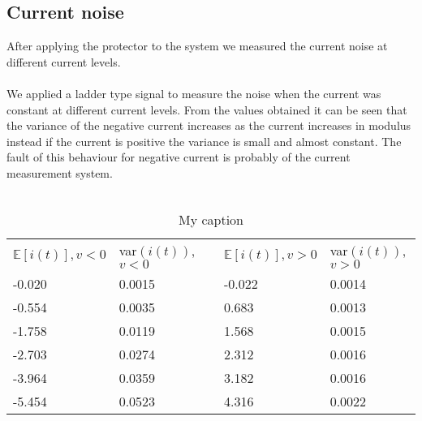 \subsection{Current noise}
After applying the protector to the system we measured the current noise at different current levels.\\ \\
We applied a ladder type signal to measure the noise when the current was constant at different current levels. From the values obtained it can be seen that the variance of the negative current increases as the current increases in modulus instead if the current is positive the variance is small and almost constant. The fault of this behaviour for negative current is probably of the current measurement system.\\ \\
\begin{table}[]
\centering
\caption{My caption}
\label{my-label}
\begin{tabular}{lllll}
\cline{1-2} \cline{4-5}
\multicolumn{1}{|l|}{$\mathbb{E}[i(t)], v < 0$} & \multicolumn{1}{l|}{var$(i(t))$, $v<0$} & \multicolumn{1}{l|}{} & \multicolumn{1}{l|}{$\mathbb{E}[i(t)], v >0$} & \multicolumn{1}{l|}{var$(i(t))$, $v>0$} \\ \cline{1-2} \cline{4-5} 
-0.020                                          & 0.0015                                  &                       & -0.022                                        & 0.0014                                  \\
-0.554                                          & 0.0035                                  &                       & 0.683                                         & 0.0013                                  \\
-1.758                                          & 0.0119                                  &                       & 1.568                                         & 0.0015                                  \\
-2.703                                          & 0.0274                                  &                       & 2.312                                         & 0.0016                                  \\
-3.964                                          & 0.0359                                  &                       & 3.182                                         & 0.0016                                  \\
-5.454                                          & 0.0523                                  &                       & 4.316                                         & 0.0022                                  \\ \cline{1-2} \cline{4-5} 
\end{tabular}
\end{table}
